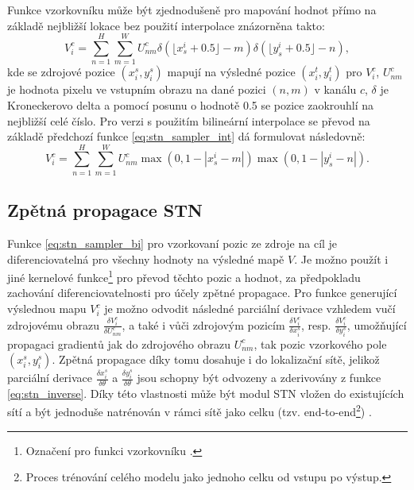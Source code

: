 Funkce vzorkovníku může být zjednodušeně pro mapování hodnot přímo na základě nejbližší lokace bez použití interpolace znázorněna takto:
\begin{equation}
    V_i^c = \sum_{n=1}^{H} \sum_{m=1}^{W} U_{nm}^c \delta(\lfloor x_s^i + 0.5 \rfloor - m) \delta(\lfloor y_s^i + 0.5 \rfloor - n),
\label{eq:stn_sampler_int}
\end{equation}
kde se zdrojové pozice $(x_i^s, y_i^s)$ mapují na výsledné pozice $(x_i^t, y_i^t)$ pro $V_i^c$, $U_{nm}^c$ je hodnota pixelu ve vstupním obrazu na dané pozici $(n, m)$ v kanálu $c$, $\delta$ je Kroneckerovo delta a pomocí posunu o hodnotě 0.5 se pozice zaokrouhlí na nejbližší celé číslo. Pro verzi s použitím bilineární interpolace se převod na základě předchozí funkce \ref{eq:stn_sampler_int} dá formulovat následovně:
\begin{equation}
    V_i^c = \sum_{n=1}^{H} \sum_{m=1}^{W} U_{nm}^c \max(0, 1 - |x_s^i - m|) \max(0, 1 - |y_s^i - n|).
\label{eq:stn_sampler_bi}
\end{equation}

\subsection{Zpětná propagace STN}

Funkce \ref{eq:stn_sampler_bi} pro vzorkovaní pozic ze zdroje na cíl je diferenciovatelná pro všechny hodnoty na výsledné mapě $V$. Je možno použít i jiné kernelové funkce\footnote{Označení pro funkci vzorkovníku \cite{stn}.} pro převod těchto pozic a hodnot, za předpokladu zachování diferenciovatelnosti pro účely zpětné propagace. Pro funkce generující výslednou mapu $V_i^c$ je možno odvodit následné parciální derivace vzhledem vučí zdrojovému obrazu $\frac{\delta V_i^c}{\delta U_{nm}^c}$, a také i vůči zdrojovým pozicím $\frac{\delta V_i^c}{\delta x_i^s}$, resp. $\frac{\delta V_i^c}{\delta y_i^s}$, umožňující propagaci gradientů jak do zdrojového obrazu $U_{nm}^c$, tak pozic vzorkového pole $(x_i^s, y_i^s)$. Zpětná propagace díky tomu dosahuje i do lokalizační sítě, jelikož parciální derivace $\frac{\delta x_i^s}{\delta \theta}$ a $\frac{\delta y_i^s}{\delta \theta}$ jsou schopny být odvozeny a zderivovány z funkce \ref{eq:stn_inverse}. Díky této vlastnosti může být modul STN vložen do existujících sítí a být jednoduše natrénován v rámci sítě jako celku (tzv. end-to-end\footnote{Proces trénování celého modelu jako jednoho celku od vstupu po výstup.}) \cite{stn}. 
\endinput